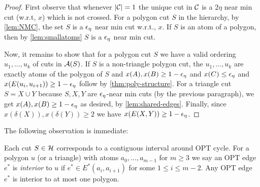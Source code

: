 \begin{proof}
First observe that whenever $|{\cal C}|=1$ the unique cut in ${\cal C}$ is a $2\eta$ near min cut (w.r.t, $x$) which is not crossed. For a polygon cut $S$ in the hierarchy, by \cref{lem:NMC}, the set $S$ is a ${\epsilon}_\eta$ near min cut w.r.t., $x$. If $S$ is an atom of a polygon, then by \cref{lem:smallatoms} $S$ is a ${\epsilon}_\eta$ near min cut.

Now, it remains to show that for a polygon cut $S$ we have a valid ordering $u_1,\dots,u_k$ of cuts in ${\cal A}(S)$. If $S$ is a non-triangle polygon cut, the $u_1,\dots,u_k$ are exactly atoms of the polygon of $S$ and $x(A),x(B)\geq 1-{\epsilon}_\eta$ and $x(C)\leq {\epsilon}_\eta$ and $x(E(u_i,u_{i+1}))\geq 1-{\epsilon}_\eta$ follow by \cref{thm:poly-structure}.
For a triangle cut $S=X\cup Y$    because $S,X,Y$  are ${\epsilon}_\eta$-near min cuts (by the previous paragraph), we get $x(A),x(B)\geq 1-{\epsilon}_\eta$ as desired, by \cref{lem:shared-edges}. Finally, since $x(\delta(X)),x(\delta(Y))\geq 2$ we have $x(E(X,Y))\geq 1-{\epsilon}_\eta$.
\end{proof}



The following observation is immediate:
\begin{observation}
Each cut $S\in \mathcal{H}$ corresponds to a contiguous interval around OPT cycle. 
For a polygon $u$ (or a triangle) with atoms $a_0,\dots,a_{m-1}$ for $m\geq 3$ we say an OPT edge $e^*$ is {\em interior} to $u$ if $e^*\in E^*(a_i,a_{i+1})$ for some $1\leq i\leq m-2$.
Any OPT edge $e^*$ is interior to at most one polygon.
\end{observation}






